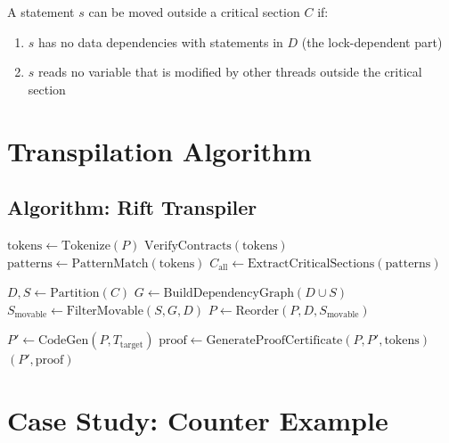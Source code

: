 \documentclass[11pt]{article}
\begin{document}
\begin{theorem} \label{thm:movable}
A statement $s$ can be moved outside a critical section $C$ if:
\begin{enumerate}
    \item $s$ has no data dependencies with statements in $D$ (the lock-dependent part)
    \item $s$ reads no variable that is modified by other threads outside the critical section
\end{enumerate}
\end{theorem}

\section{Transpilation Algorithm}

\subsection{Algorithm: Rift Transpiler}

\begin{algorithm}
\caption{Rift Transpiler: Lock Minimization}
\label{alg:rift}
\begin{algorithmic}[1]
    \State $\text{tokens} \gets \text{Tokenize}(P)$ 
    \State $\text{VerifyContracts}(\text{tokens})$ 
    \State $\text{patterns} \gets \text{PatternMatch}(\text{tokens})$ 
    \State $C_{\text{all}} \gets \text{ExtractCriticalSections}(\text{patterns})$
    
        \State $D, S \gets \text{Partition}(C)$ 
        \State $G \gets \text{BuildDependencyGraph}(D \cup S)$
        \State $S_{\text{movable}} \gets \text{FilterMovable}(S, G, D)$
        \State $P \gets \text{Reorder}(P, D, S_{\text{movable}})$ 
    \EndFor
    
    \State $P' \gets \text{CodeGen}(P, T_{\text{target}})$ 
    \State $\text{proof} \gets \text{GenerateProofCertificate}(P, P', \text{tokens})$
    \Return $(P', \text{proof})$
\EndProcedure
\end{algorithmic}
\end{algorithm}

\section{Case Study: Counter Example}
\end{document}
